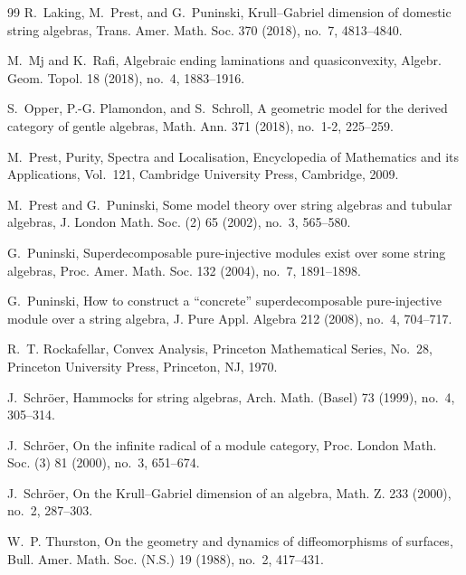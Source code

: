 \documentclass[11pt,a4paper,reqno]{amsart}
\def\emph#1{#1}%
\def\textbf#1{#1}%
\theoremstyle{definition}
\theoremstyle{remark}
\begin{document}
\begin{thebibliography}{99}
R.~Laking, M.~Prest, and G.~Puninski,
\emph{Krull--Gabriel dimension of domestic string algebras}, Trans. Amer. Math. Soc. \textbf{370} (2018), no.~7, 4813--4840.

M.~Mj and K.~Rafi, \emph{Algebraic ending laminations and quasiconvexity}, Algebr. Geom. Topol. \textbf{18} (2018), no.~4, 1883--1916.

S.~Opper, P.-G. Plamondon, and S.~Schroll,
\emph{A geometric model for the derived category of gentle algebras},
Math. Ann. \textbf{371} (2018), no.~1-2, 225--259.

M.~Prest,
\emph{Purity, Spectra and Localisation},
Encyclopedia of Mathematics and its Applications, Vol.~121, Cambridge University Press, Cambridge, 2009.

M.~Prest and G.~Puninski,
\emph{Some model theory over string algebras and tubular algebras},
J. London Math. Soc. (2) \textbf{65} (2002), no.~3, 565--580.

G.~Puninski,
\emph{Superdecomposable pure-injective modules exist over some string algebras},
Proc. Amer. Math. Soc. \textbf{132} (2004), no.~7, 1891--1898.

G.~Puninski,
\emph{How to construct a ``concrete'' superdecomposable pure-injective module over a string algebra},
J. Pure Appl. Algebra \textbf{212} (2008), no.~4, 704--717.

R.~T. Rockafellar,
\emph{Convex Analysis},
Princeton Mathematical Series, No.~28, Princeton University Press, Princeton, NJ, 1970.

J.~Schr\"oer,
\emph{Hammocks for string algebras},
Arch. Math. (Basel) \textbf{73} (1999), no.~4, 305--314.

J.~Schr\"oer,
\emph{On the infinite radical of a module category},
Proc. London Math. Soc. (3) \textbf{81} (2000), no.~3, 651--674.

J.~Schr\"oer,
\emph{On the Krull--Gabriel dimension of an algebra},
Math. Z. \textbf{233} (2000), no.~2, 287--303.

W.~P. Thurston,
\emph{On the geometry and dynamics of diffeomorphisms of surfaces},
Bull. Amer. Math. Soc. (N.S.) \textbf{19} (1988), no.~2, 417--431.


\end{thebibliography}
\end{document}
